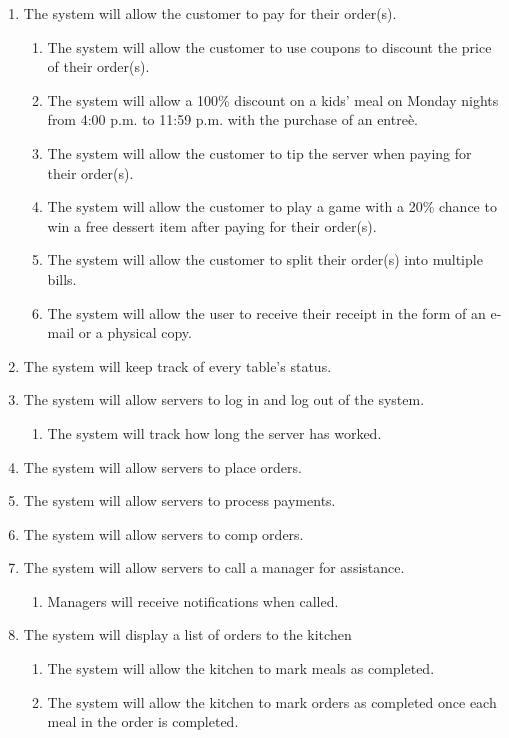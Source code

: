 \documentclass[12pt]{article}
\begin{document}
\begin{enumerate}
			\item The system will allow the customer to pay for their order(s).
				\begin{enumerate}
					\item The system will allow the customer to use coupons to discount the price of their order(s).
					\item The system will allow a 100\% discount on a kids' meal on Monday nights from 4:00 p.m. to 11:59 p.m. with the purchase of an entre\`e.
					\item The system will allow the customer to tip the server when paying for their order(s).
					\item The system will allow the customer to play a game with a 20\% chance to win a free dessert item after paying for their order(s).
					\item The system will allow the customer to split their order(s) into multiple bills.
					\item The system will allow the user to receive their receipt in the form of an e-mail or a physical copy.
				\end{enumerate}

			\item The system will keep track of every table's status.

			\item The system will allow servers to log in and log out of the system.
				\begin{enumerate}
					\item The system will track how long the server has worked.
				\end{enumerate}

			\item The system will allow servers to place orders.

			\item The system will allow servers to process payments.

			\item The system will allow servers to comp orders.

			\item The system will allow servers to call a manager for assistance.
				\begin{enumerate}
					\item Managers will receive notifications when called.
				\end{enumerate}

			\item The system will display a list of orders to the kitchen
				\begin{enumerate}
					\item The system will allow the kitchen to mark meals as completed.
					\item The system will allow the kitchen to mark orders as completed once each meal in the order is completed.
				\end{enumerate}


\end{enumerate}
\end{document}
